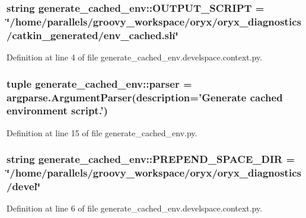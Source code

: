 \subsubsection[{\-O\-U\-T\-P\-U\-T\-\_\-\-S\-C\-R\-I\-P\-T}]{\setlength{\rightskip}{0pt plus 5cm}string {\bf generate\-\_\-cached\-\_\-env\-::\-O\-U\-T\-P\-U\-T\-\_\-\-S\-C\-R\-I\-P\-T} = \char`\"{}/home/parallels/groovy\-\_\-workspace/oryx/oryx\-\_\-diagnostics/catkin\-\_\-generated/env\-\_\-cached.\-sh\char`\"{}}\label{namespacegenerate__cached__env_a2b990820565b508f09bdf4b646b41248}


\-Definition at line 4 of file generate\-\_\-cached\-\_\-env.\-develspace.\-context.\-py.

\subsubsection[{parser}]{\setlength{\rightskip}{0pt plus 5cm}tuple {\bf generate\-\_\-cached\-\_\-env\-::parser} = argparse.\-Argument\-Parser(description='\-Generate cached environment script.')}\label{namespacegenerate__cached__env_adc7207f2d17ca27671a8a3a61ddbe3b1}


\-Definition at line 15 of file generate\-\_\-cached\-\_\-env.\-py.

\subsubsection[{\-P\-R\-E\-P\-E\-N\-D\-\_\-\-S\-P\-A\-C\-E\-\_\-\-D\-I\-R}]{\setlength{\rightskip}{0pt plus 5cm}string {\bf generate\-\_\-cached\-\_\-env\-::\-P\-R\-E\-P\-E\-N\-D\-\_\-\-S\-P\-A\-C\-E\-\_\-\-D\-I\-R} = \char`\"{}/home/parallels/groovy\-\_\-workspace/oryx/oryx\-\_\-diagnostics/devel\char`\"{}}\label{namespacegenerate__cached__env_adf2800a5704edaa58431a0f1c5704a4f}


\-Definition at line 6 of file generate\-\_\-cached\-\_\-env.\-develspace.\-context.\-py.

